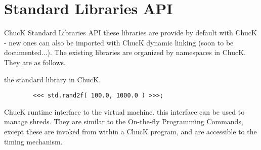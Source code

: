 \chapter{Standard Libraries API}

ChucK Standard Libraries API 
these libraries are provide by default with ChucK - new ones can also be 
imported with ChucK dynamic linking (soon to be documented...). 
The existing libraries are organized by namespaces in ChucK. 
They are as follows. 



the standard library in ChucK. \\
\example

\begin{verbatim}
        <<< std.rand2f( 100.0, 1000.0 ) >>>;
\end{verbatim}







































ChucK runtime interface to the virtual machine. this interface can be used to manage shreds. 
They are similar to the On-the-fly Programming Commands, except these are invoked from 
within a ChucK program, and are accessible to the timing mechanism. 

